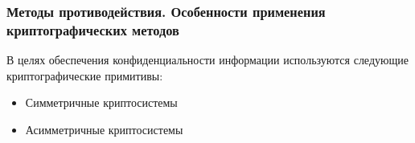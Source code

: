 %

\subsubsection{Методы противодействия. Особенности применения криптографических методов}
В целях обеспечения конфиденциальности информации используются следующие криптографические примитивы:
\begin{itemize}
    \item Симметричные криптосистемы
    \item Асимметричные криптосистемы
\end{itemize}

